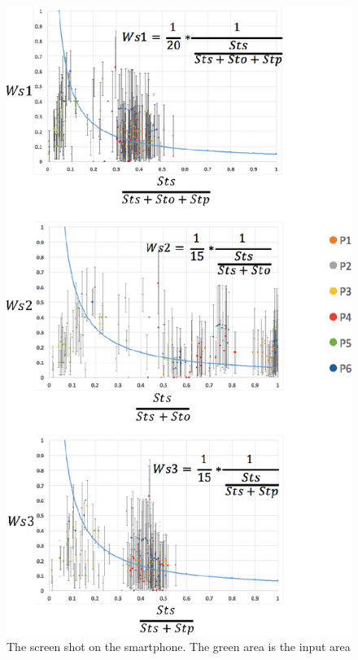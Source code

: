 \begin{figure}[!h]
\centering
\includegraphics[width=0.7\columnwidth]{img/weight_size.eps}
\caption{The screen shot on the smartphone. The green area is the input area}
\label{fig:weight_size}
\end{figure}

